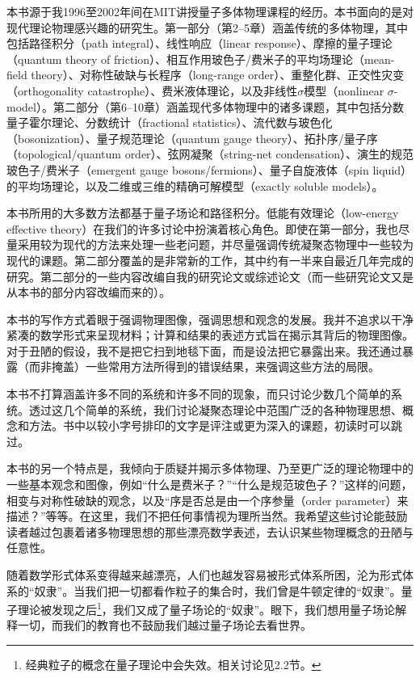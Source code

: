 本书源于我1996至2002年间在MIT讲授量子多体物理课程的经历。本书面向的是对现代理论物理感兴趣的研究生。第一部分（第2--5章）涵盖传统的多体物理，其中包括路径积分（path integral）、线性响应（linear response）、摩擦的量子理论（quantum theory of friction）、相互作用玻色子/费米子的平均场理论（mean-field theory）、对称性破缺与长程序（long-range order）、重整化群、正交性灾变（orthogonality catastrophe）、费米液体理论，以及非线性$\sigma$模型（nonlinear $\sigma$-model）。第二部分（第6--10章）涵盖现代多体物理中的诸多课题，其中包括分数量子霍尔理论、分数统计（fractional statistics）、流代数与玻色化（bosonization）、量子规范理论（quantum gauge theory）、拓扑序/量子序（topological/quantum order）、弦网凝聚（string-net condensation）、演生的规范玻色子/费米子（emergent gauge bosons/fermions）、量子自旋液体（spin liquid）的平均场理论，以及二维或三维的精确可解模型（exactly soluble models）。

本书所用的大多数方法都基于量子场论和路径积分。低能有效理论（low-energy effective theory）在我们的许多讨论中扮演着核心角色。即使在第一部分，我也尽量采用较为现代的方法来处理一些老问题，并尽量强调传统凝聚态物理中一些较为现代的课题。第二部分覆盖的是非常新的工作，其中约有一半来自最近几年完成的研究。第二部分的一些内容改编自我的研究论文或综述论文（而一些研究论文又是从本书的部分内容改编而来的）。

本书的写作方式着眼于强调物理图像，强调思想和观念的发展。我并不追求以干净紧凑的数学形式来呈现材料；计算和结果的表述方式旨在揭示其背后的物理图像。对于丑陋的假设，我不是把它扫到地毯下面，而是设法把它暴露出来。我还通过暴露（而非掩盖）一些常用方法所得到的错误结果，来强调这些方法的局限。

本书不打算涵盖许多不同的系统和许多不同的现象，而只讨论少数几个简单的系统。透过这几个简单的系统，我们讨论凝聚态理论中范围广泛的各种物理思想、概念和方法。书中以较小字号排印的文字是评注或更为深入的课题，初读时可以跳过。

本书的另一个特点是，我倾向于质疑并揭示多体物理、乃至更广泛的理论物理中的一些基本观念和图像，例如“什么是费米子？”“什么是规范玻色子？”这样的问题，相变与对称性破缺的观念，以及“序是否总是由一个序参量（order parameter）来描述？”等等。在这里，我们不把任何事情视为理所当然。我希望这些讨论能鼓励读者越过包裹着诸多物理思想的那些漂亮数学表述，去认识某些物理概念的丑陋与任意性。

随着数学形式体系变得越来越漂亮，人们也越发容易被形式体系所困，沦为形式体系的“奴隶”。当我们把一切都看作粒子的集合时，我们曾是牛顿定律的“奴隶”。量子理论被发现之后\footnote{经典粒子的概念在量子理论中会失效。相关讨论见2.2节。}，我们又成了量子场论的“奴隶”。眼下，我们想用量子场论解释一切，而我们的教育也不鼓励我们越过量子场论去看世界。

